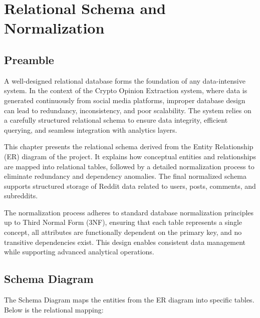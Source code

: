 
\chapter{Relational Schema and Normalization}

\section{Preamble}

A well-designed relational database forms the foundation of any data-intensive system. In the context of the Crypto Opinion Extraction system, where data is generated continuously from social media platforms, improper database design can lead to redundancy, inconsistency, and poor scalability. The system relies on a carefully structured relational schema to ensure data integrity, efficient querying, and seamless integration with analytics layers.

This chapter presents the relational schema derived from the Entity Relationship (ER) diagram of the project. It explains how conceptual entities and relationships are mapped into relational tables, followed by a detailed normalization process to eliminate redundancy and dependency anomalies. The final normalized schema supports structured storage of Reddit data related to users, posts, comments, and subreddits.

The normalization process adheres to standard database normalization principles up to Third Normal Form (3NF), ensuring that each table represents a single concept, all attributes are functionally dependent on the primary key, and no transitive dependencies exist. This design enables consistent data management while supporting advanced analytical operations.

\section{Schema Diagram}

The Schema Diagram maps the entities from the ER diagram into specific tables. Below is the relational mapping:


